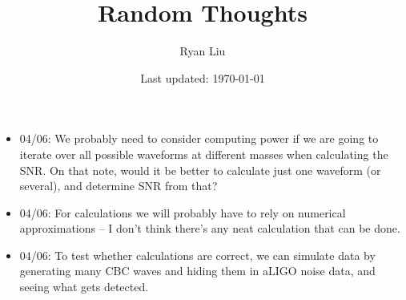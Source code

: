 \documentclass{article}
\title{Random Thoughts}
\author{Ryan Liu}
\date{Last updated: \today}
\begin{document}
\maketitle

\begin{itemize}
    \item 04/06: We probably need to consider computing power if we are going to iterate over all possible waveforms at different masses when calculating the SNR. On that note, would it be better to calculate just one waveform (or several), and determine SNR from that?
    \item 04/06: For calculations we will probably have to rely on numerical approximations -- I don't think there's any neat calculation that can be done. 
    \item 04/06: To test whether calculations are correct, we can simulate data by generating many CBC waves and hiding them in aLIGO noise data, and seeing what gets detected. 
\end{itemize}
\end{document}

